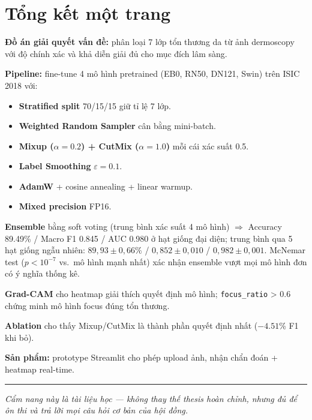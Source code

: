 \documentclass[11pt,a4paper]{article}
\begin{document}
\section{Tổng kết một trang}

\textbf{Đồ án giải quyết vấn đề:} phân loại 7 lớp tổn thương da từ ảnh dermoscopy với độ chính xác và khả diễn giải đủ cho mục đích lâm sàng.

\textbf{Pipeline:} fine-tune 4 mô hình pretrained (EB0, RN50, DN121, Swin) trên ISIC 2018 với:
\begin{itemize}[leftmargin=*]
  \item \textbf{Stratified split} 70/15/15 giữ tỉ lệ 7 lớp.
  \item \textbf{Weighted Random Sampler} cân bằng mini-batch.
  \item \textbf{Mixup ($\alpha=0.2$) + CutMix ($\alpha=1.0$)} mỗi cái xác suất 0.5.
  \item \textbf{Label Smoothing} $\varepsilon = 0.1$.
  \item \textbf{AdamW} + cosine annealing + linear warmup.
  \item \textbf{Mixed precision} FP16.
\end{itemize}

\textbf{Ensemble} bằng soft voting (trung bình xác suất 4 mô hình) $\Rightarrow$ Accuracy 89.49\% / Macro F1 0.845 / AUC 0.980 ở hạt giống đại diện; trung bình qua 5 hạt giống ngẫu nhiên: $89{,}93 \pm 0{,}66\%$ / $0{,}852 \pm 0{,}010$ / $0{,}982 \pm 0{,}001$. McNemar test ($p < 10^{-7}$ vs.\ mô hình mạnh nhất) xác nhận ensemble vượt mọi mô hình đơn có ý nghĩa thống kê.

\textbf{Grad-CAM} cho heatmap giải thích quyết định mô hình; \texttt{focus\_ratio} > 0.6 chứng minh mô hình focus đúng tổn thương.

\textbf{Ablation} cho thấy Mixup/CutMix là thành phần quyết định nhất ($-4.51$\% F1 khi bỏ).

\textbf{Sản phẩm:} prototype Streamlit cho phép upload ảnh, nhận chẩn đoán + heatmap real-time.

\vspace{12pt}
\hrule
\vspace{6pt}
\begin{center}
\small \textit{Cẩm nang này là tài liệu học --- không thay thế thesis hoàn chỉnh, nhưng đủ để ôn thi và trả lời mọi câu hỏi cơ bản của hội đồng.}
\end{center}
\end{document}
